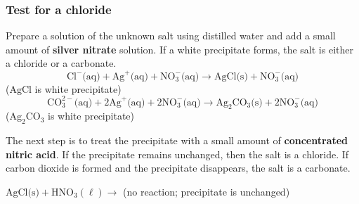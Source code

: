             \subsubsection*{Test for a chloride}
            \nopagebreak
        \label{m38719*id341138}Prepare a solution of the unknown salt using distilled water and add a small amount of \textbf{silver nitrate} solution. If a white precipitate forms, the salt is either a chloride or a carbonate.
        \label{m38719*id341148}\nopagebreak\noindent{}
    \begin{equation*}
    {\text{Cl}}^{-} \text{(aq)} +{\text{Ag}}^{+} \text{(aq)} + \text{NO}_{3}^{-} \text{(aq)} \to \text{AgCl} \text{(s)} +\text{NO}_{3}^{-} \text{(aq)}
      \end{equation*}
     ($\text{AgCl}$ is white precipitate)
        \label{m38719*id341211}\nopagebreak\noindent{}
    \begin{equation*}
    \text{CO}_{3}^{2-} \text{(aq)} + 2{\text{Ag}}^{+} \text{(aq)} + 2\text{NO}_{3}^{-} \text{(aq)} \to {\text{Ag}}_{2}{\text{CO}}_{3} \text{(s)} + 2\text{NO}_{3}^{-} \text{(aq)}
      \end{equation*}
    (${\text{Ag}}_{2}{\text{CO}}_{3}$ is white precipitate)\par 
        \label{m38719*id341323}The next step is to treat the precipitate with a small amount of \textbf{concentrated nitric acid}. If the precipitate remains unchanged, then the salt is a chloride. If carbon dioxide is formed and the precipitate disappears, the salt is a carbonate.\par 
        \label{m38719*id341334}$\text{AgCl} \text{(s)} + {\text{HNO}}_{3} (\ell) \to $ (no reaction; precipitate is unchanged)\par 
